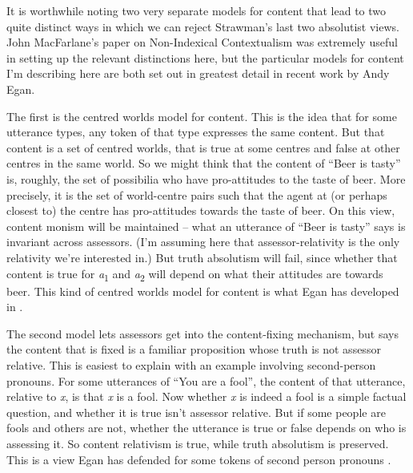 It is worthwhile noting two very separate models for content that lead to two quite distinct ways in which we can reject Strawman's last two absolutist views. John MacFarlane's paper on Non-Indexical Contextualism \citet{MacFarlane2009-MACNC} was extremely useful in setting up the relevant distinctions here, but the particular models for content I'm describing here are both set out in greatest detail in recent work by Andy Egan.

The first is the centred worlds model for content. This is the idea that for some utterance types, any token of that type expresses the same content. But that content is a set of centred worlds, that is true at some centres and false at other centres in the same world. So we might think that the content of ``Beer is tasty'' is, roughly, the set of possibilia who have pro-attitudes to the taste of beer. More precisely, it is the set of world-centre pairs such that the agent at (or perhaps closest to) the centre has pro-attitudes towards the taste of beer. On this view, content monism will be maintained -- what an utterance of ``Beer is tasty'' says is invariant across assessors. (I'm assuming here that assessor-relativity is the only relativity we're interested in.) But truth absolutism will fail, since whether that content is true for \textit{a}\textsubscript{1} and \textit{a}\textsubscript{2} will depend on what their attitudes are towards beer. This kind of centred worlds model for content is what Egan has developed in \citep{Egan2007-EGAEMR}.

The second model lets assessors get into the content-fixing mechanism, but says the content that is fixed is a familiar proposition whose truth is not assessor relative. This is easiest to explain with an example involving second-person pronouns. For some utterances of ``You are a fool'', the content of that utterance, relative to \textit{x}, is that \textit{x} is a fool. Now whether \textit{x} is indeed a fool is a simple factual question, and whether it is true isn't assessor relative. But if some people are fools and others are not, whether the utterance is true or false depends on who is assessing it. So content relativism is true, while truth absolutism is preserved. This is a view Egan has defended for some tokens of second person pronouns \citep{Egan2009-EGABBA} .

